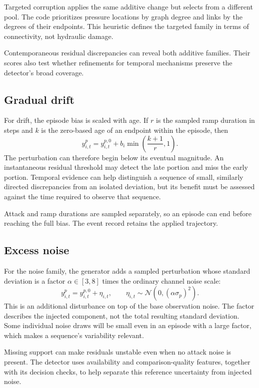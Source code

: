 Targeted corruption applies the same additive change but selects from a different pool. The code prioritizes pressure locations by graph degree and links by the degrees of their endpoints. This heuristic defines the targeted family in terms of connectivity, not hydraulic damage.

Contemporaneous residual discrepancies can reveal both additive families. Their scores also test whether refinements for temporal mechanisms preserve the detector's broad coverage.

\subsection{Gradual drift}
For drift, the episode bias is scaled with age. If $r$ is the sampled ramp duration in steps and $k$ is the zero-based age of an endpoint within the episode, then
\begin{equation}
 y^p_{i,t}=y^{p,0}_{i,t}+b_i\min\left(\frac{k+1}{r},1\right).
 \label{eq:drift}
\end{equation}
The perturbation can therefore begin below its eventual magnitude. An instantaneous residual threshold may detect the late portion and miss the early portion. Temporal evidence can help distinguish a sequence of small, similarly directed discrepancies from an isolated deviation, but its benefit must be assessed against the time required to observe that sequence.

Attack and ramp durations are sampled separately, so an episode can end before reaching the full bias. The event record retains the applied trajectory.

\subsection{Excess noise}
For the noise family, the generator adds a sampled perturbation whose standard deviation is a factor $\alpha\in[3,8]$ times the ordinary channel noise scale:
\begin{equation}
 y^p_{i,t}=y^{p,0}_{i,t}+\eta_{i,t},\qquad
 \eta_{i,t}\sim\mathcal N(0,(\alpha\sigma_p)^2).
\end{equation}
This is an additional disturbance on top of the base observation noise. The factor describes the injected component, not the total resulting standard deviation. Some individual noise draws will be small even in an episode with a large factor, which makes a sequence's variability relevant.

Missing support can make residuals unstable even when no attack noise is present. The detector uses availability and comparison-quality features, together with its decision checks, to help separate this reference uncertainty from injected noise.

